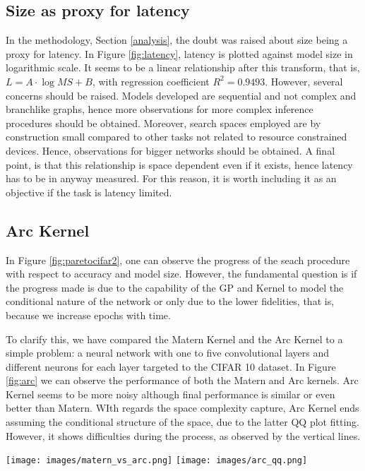 \documentclass[a4paper, twocolumn]{article}
\begin{document}
\subsection{Size as proxy for latency}

In the methodology, Section \ref{analysis}, the doubt was raised about size being a proxy for latency. In Figure \ref{fig:latency}, latency is plotted against model size in logarithmic scale. It seems to be a linear relationship after this transform, that is, $L = A\cdot \log{MS} + B$, with regression coefficient $R^{2} = 0.9493$. However, several concerns should be raised. Models developed are sequential and not complex and branchlike graphs, hence more observations for more complex inference procedures should be obtained. Moreover, search spaces employed are by construction small compared to other tasks not related to resource constrained devices. Hence, observations for bigger networks should be obtained. A final point, is that this relationship is space dependent even if it exists, hence latency has to be in anyway measured. For this reason, it is worth including it as an objective if the task is latency limited.




\subsection{Arc Kernel}

In Figure \ref{fig:paretocifar2}, one can observe the progress of the seach procedure with respect to accuracy and model size. However, the fundamental question is if the progress made is due to the capability of the GP and Kernel to model the conditional nature of the network or only due to the lower fidelities, that is, because we increase epochs with time. 

To clarify this, we have compared the Matern Kernel and  the Arc Kernel to a simple problem: a neural network with one to five convolutional layers and different neurons for each layer targeted to the CIFAR 10 dataset. In Figure \ref{fig:arc} we can observe the performance of both the Matern and Arc kernels. Arc Kernel seems to be more noisy although final performance is similar or even better than Matern. WIth regards the space complexity capture, Arc Kernel ends assuming the conditional structure of the space, due to the latter QQ plot fitting. However, it shows difficulties during the process, as observed by the vertical lines. 

\begin{figure*}
	\centering
\texttt{[image: images/matern\_vs\_arc.png]}
\texttt{[image: images/arc\_qq.png]}
\caption{Left: evolution of performance of a CNN with variable layers in a bayesian optimization procedure with a GP based on Arc (blue) and Matern (red). Vertical bars indicate standard deviation of the different evaluations inside the same step. Right: Prediction values of the GP for each evaluation step and the real observed values (by evaluating the network)}
\label{fig:arc}
\end{figure*}
\end{document}
